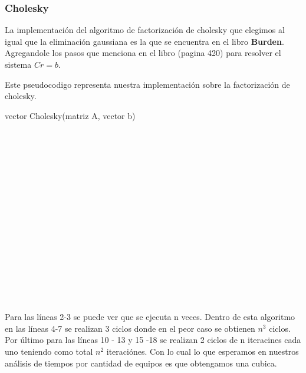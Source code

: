 \newpage
\subsubsection{Cholesky}

La implementación del algoritmo de factorizaci\'on de cholesky que elegimos al igual que la eliminaci\'on gaussiana es la que se encuentra en el libro \textbf{Burden}.
Agregandole los pasos que menciona en el libro (pagina 420) para resolver el sistema $Cr$$=$$b$.

Este pseudocodigo representa nuestra implementaci\'on sobre la factorizaci\'on de cholesky.

\begin{algorithm}
    \begin{algorithmic}[1]\parskip=2mm
        \caption{vector Cholesky(matriz A, vector b)}
        \\
        \\
        \\
        \\
        \\
        \\
        \\
        \\
        \\
        \\
        \\
        \\
        \\
        \\
        \\
    \end{algorithmic}
\end{algorithm}
Para las l\'ineas 2-3 se puede ver que se ejecuta n veces.
Dentro de esta algoritmo en las l\'ineas 4-7 se realizan 3 ciclos donde en el peor caso se obtienen $n^3 $ ciclos.
Por \'ultimo para las l\'ineas 10 - 13 y 15 -18 se realizan 2 ciclos de n iteracines cada uno teniendo como total $n^2$ iteraci\'ones.
Con lo cual lo que esperamos en nuestros an\'alisis de tiempos por cantidad de equipos es que obtengamos una cubica.

\newpage

